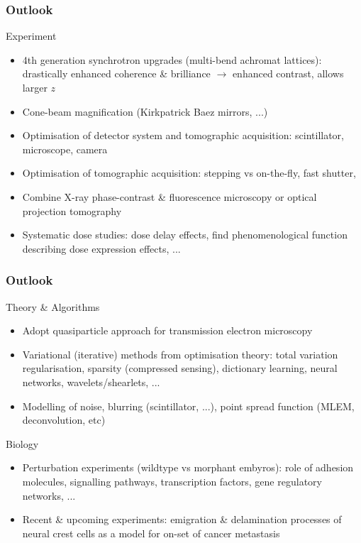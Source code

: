 \documentclass{beamer}
\begin{document}
\begin{frame}
  \frametitle{Outlook}

  Experiment
  \begin{itemize}
  \item 4th generation synchrotron upgrades (multi-bend achromat
    lattices): drastically enhanced coherence \& brilliance
    $\rightarrow$ enhanced contrast, allows larger $z$
  \item Cone-beam magnification (Kirkpatrick Baez mirrors, ...)
  \item Optimisation of detector system and tomographic acquisition:
    scintillator, microscope, camera
  \item Optimisation of tomographic acquisition: stepping vs
    on-the-fly, fast shutter,
  \item Combine X-ray phase-contrast \& fluorescence
    microscopy or optical projection tomography
  \item Systematic dose studies: dose delay effects, find
    phenomenological function describing dose expression effects, ...
  \end{itemize}

\end{frame}

\begin{frame}
  \frametitle{Outlook}

  Theory \& Algorithms
  \begin{itemize}
  \item Adopt quasiparticle approach for transmission electron microscopy 
  \item Variational (iterative) methods from optimisation theory:
    total variation regularisation, sparsity (compressed sensing),
    dictionary learning, neural networks, wavelets/shearlets, ...
  \item Modelling of noise, blurring (scintillator, ...), point spread
    function (MLEM, deconvolution, etc)
  \end{itemize}

  Biology
  \begin{itemize}
  \item Perturbation experiments (wildtype vs morphant embyros): role
    of adhesion molecules, signalling pathways, transcription factors,
    gene regulatory networks, ...
  \item Recent \& upcoming experiments: emigration \& delamination
    processes of neural crest cells as a model for on-set of cancer
    metastasis
  \end{itemize}
\end{frame}
\end{document}
